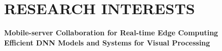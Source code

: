 \section*{RESEARCH INTERESTS}

\textbf{Mobile-server Collaboration for Real-time Edge Computing} \\
\textbf{Efficient DNN Models and Systems for Visual Processing}
